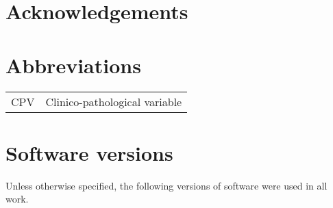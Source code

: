 \documentclass[a4paper]{report}
\begin{document}
\title{}
\author{Mark Pinese}
\date{}

\maketitle

\tableofcontents
\listoffigures
\listoftables

\chapter*{Acknowledgements}

\begin{abstract}
\end{abstract}


\chapter*{Abbreviations}

\begin{tabular}[c]{ l | l }
  CPV           & Clinico-pathological variable
\end{tabular}  


\chapter*{Software versions}
Unless otherwise specified, the following versions of software were used in all work.
\end{document}
